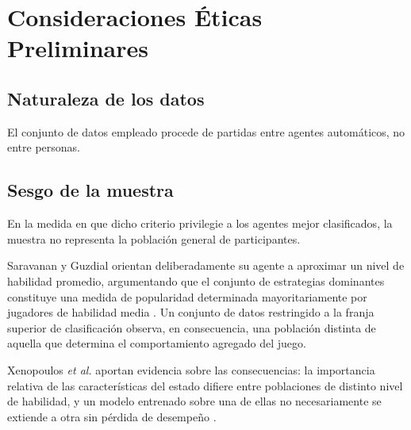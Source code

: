 %
\section{Consideraciones Éticas Preliminares}
\label{sec:etica}

\subsection{Naturaleza de los datos}
\label{subsec:sensibilidad}

El conjunto de datos empleado procede de partidas entre agentes
automáticos, no entre personas. 


\subsection{Sesgo de la muestra}
\label{subsec:sesgo}

 En la medida en que dicho criterio privilegie a los agentes
mejor clasificados, la muestra no representa la población general de
participantes.

Saravanan y Guzdial orientan deliberadamente su agente a aproximar un nivel
de habilidad promedio, argumentando que el conjunto de estrategias
dominantes constituye una medida de popularidad determinada mayoritariamente
por jugadores de habilidad media \cite{saravanan_metadiscovery_2024}. Un
conjunto de datos restringido a la franja superior de clasificación observa,
en consecuencia, una población distinta de aquella que determina el
comportamiento agregado del juego.

Xenopoulos \textit{et al.} aportan evidencia sobre las consecuencias: la
importancia relativa de las características del estado difiere entre
poblaciones de distinto nivel de habilidad, y un modelo entrenado sobre una
de ellas no necesariamente se extiende a otra sin pérdida de desempeño
\cite{xenopoulos_winprob_2022}.

